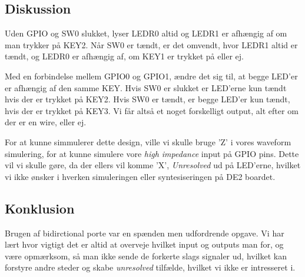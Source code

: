 \documentclass[../journal2.tex]{subfiles}
\begin{document}
\subsection{Diskussion}

Uden GPIO og SW0 slukket, lyser LEDR0 altid og LEDR1 er afhængig af om man trykker på KEY2. Når SW0 er tændt, er det omvendt, hvor LEDR1 altid er tændt, og LEDR0 er afhængig af, om KEY1 er trykket på eller ej. \par
Med en forbindelse mellem GPIO0 og GPIO1, ændre det sig til, at begge LED'er er afhængig af den samme KEY. Hvis SW0 er slukket er LED'erne kun tændt hvis der er trykket på KEY2. Hvis SW0 er tændt, er begge LED'er kun tændt, hvis der er trykket på KEY3. Vi får altså et noget forskelligt output, alt efter om der er en wire, eller ej.\par
For at kunne simmulerer dette design, ville vi skulle bruge 'Z' i vores waveform simulering, for at kunne simulere vore \textit{high impedance} input på GPIO pins. Dette vil vi skulle gøre, da der ellers vil komme 'X', \textit{Unresolved} ud på LED'erne, hvilket vi ikke ønsker i hverken simuleringen eller syntesiseringen på DE2 boardet.

\subsection{Konklusion}

Brugen af bidirctional porte var en spænden men udfordrende opgave. Vi har lært hvor vigtigt det er altid at overveje hvilket input og outputs man for, og være opmærksom, så man ikke sende de forkerte slags signaler ud, hvilket kan forstyre andre steder og skabe \textit{unresolved} tilfælde, hvilket vi ikke er intresseret i. 
\end{document}
